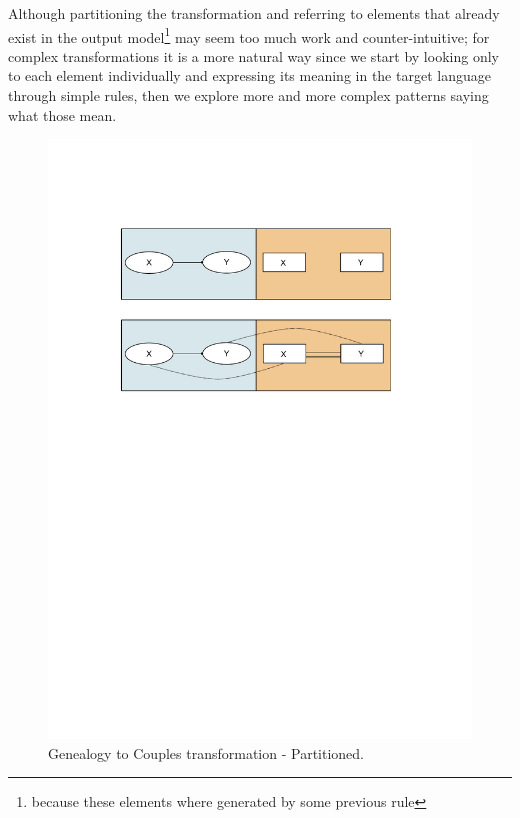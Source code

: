 Although partitioning the transformation and referring
to elements that already exist in the output model\footnote{because these elements where generated by some previous rule} may seem too much work and counter-intuitive; for complex transformations it is a more natural way since we start by looking only to each
element individually and expressing its meaning in the target language through simple rules, then we explore more and more complex patterns saying what those
mean.


\begin{figure}[h]
\begin{center}
  \includegraphics[scale=0.9, trim=3.5cm 17.0cm 3.8cm 4.2cm,
  clip]{imgs/gen_to_couple_example_extended.pdf}
  \caption{Genealogy to Couples transformation - Partitioned.}
  \label{fig:gen_to_couple_example_extended}
\end{center}
\end{figure}


